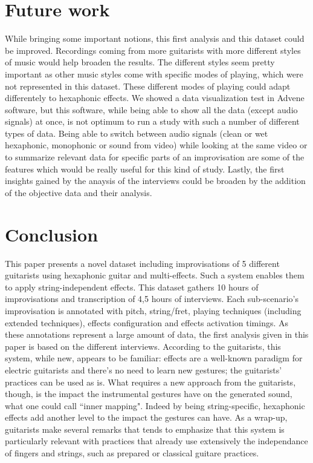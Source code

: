 \documentclass{article}
\begin{document}
\section{Future work}\label{sec:future_work}

While bringing some important notions, this first analysis and this dataset could be improved. Recordings coming from more guitarists with more different styles of music would help broaden the results.  The different styles seem pretty important as other music styles come with specific modes of playing, which were not represented in this dataset. These different modes of playing could adapt differentely to hexaphonic effects.
We showed a data visualization test in Advene software, but this software, while being able to show all the data (except audio signals) at once, is not optimum to run a study with such a number of different types of data.  Being able to switch between audio signals (clean or wet hexaphonic, monophonic or sound from video) while looking at the same video or to summarize relevant data for specific parts of an improvisation are some of the features which would be really useful for this kind of study.
Lastly, the first insights gained by the anaysis of the interviews could be broaden by the addition of the objective data and their analysis.

\section{Conclusion}\label{sec:conclusion}
This paper presents a novel dataset including improvisations of 5 different guitarists using hexaphonic guitar and multi-effects. Such a system enables them to apply string-independent effects. This dataset gathers 10 hours of improvisations and transcription of 4,5 hours of interviews. 
Each sub-scenario's improvisation is annotated with pitch, string/fret, playing techniques (including extended techniques), effects configuration and effects activation timings. As these annotations represent a large amount of data, the first analysis given in this paper is based on the different interviews. According to the guitarists, this system, while new, appears to be familiar: effects are a well-known paradigm for electric guitarists and there's no need to learn new gestures; the guitarists' practices can be used as is. What requires a new approach from the guitarists, though, is the impact the instrumental gestures have on the generated sound, what one could call ``inner mapping".  Indeed by being string-specific, hexaphonic effects add another level to the impact the gestures can have.
As a wrap-up, guitarists make several remarks that tends to emphasize that this system is particularly relevant with practices that already use extensively the independance of fingers and strings, such as prepared or classical guitare practices.
\end{document}
